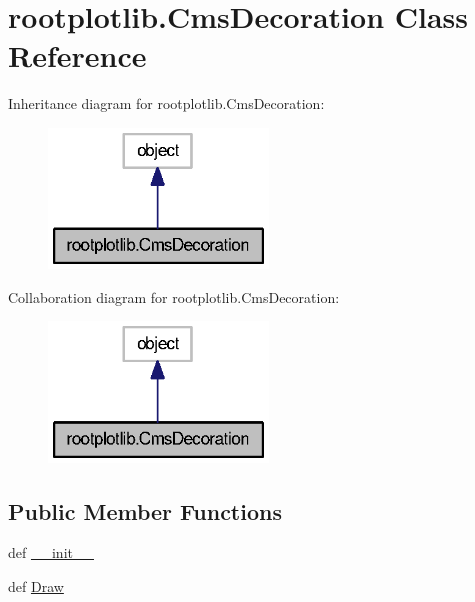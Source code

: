 \section{rootplotlib.\-Cms\-Decoration Class Reference}
\label{classrootplotlib_1_1CmsDecoration}


Inheritance diagram for rootplotlib.\-Cms\-Decoration\-:
\nopagebreak
\begin{figure}[H]
\begin{center}
\leavevmode
\includegraphics[width=166pt]{classrootplotlib_1_1CmsDecoration__inherit__graph}
\end{center}
\end{figure}


Collaboration diagram for rootplotlib.\-Cms\-Decoration\-:
\nopagebreak
\begin{figure}[H]
\begin{center}
\leavevmode
\includegraphics[width=166pt]{classrootplotlib_1_1CmsDecoration__coll__graph}
\end{center}
\end{figure}
\subsection*{Public Member Functions}
\begin{DoxyCompactItemize}
\item 
def \hyperlink{classrootplotlib_1_1CmsDecoration_ac069bc5d7b98939698615e3ea9548130}{\-\_\-\-\_\-init\-\_\-\-\_\-}
\item 
def \hyperlink{classrootplotlib_1_1CmsDecoration_a3b872c85dd2bdcb91f09b0d19b466d43}{Draw}
\end{DoxyCompactItemize}
